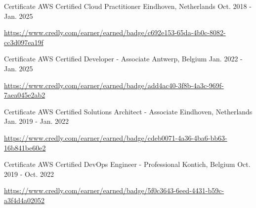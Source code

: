 

\begin{cventries}

  \cventry
    {Certificate} %
    {AWS Certified Cloud Practitioner} %
    {Eindhoven, Netherlands} %
    {Oct. 2018 - Jan. 2025} %
    {
      \begin{cvitems} %
        \item \url{https://www.credly.com/earner/earned/badge/c692e153-65da-4b0c-8082-cc3d097ea19f}
      \end{cvitems}
    }

  \cventry
    {Certificate} %
    {AWS Certified Developer - Associate} %
    {Antwerp, Belgium} %
    {Jan. 2022 - Jan. 2025} %
    {
      \begin{cvitems} %
        \item \url{https://www.credly.com/earner/earned/badge/add4ac40-3f8b-4a3c-969f-7aea045e2ab2}
      \end{cvitems}
    }

  \cventry
    {Certificate} %
    {AWS Certified Solutions Architect - Associate} %
    {Eindhoven, Netherlands} %
    {Jan. 2019 - Jan. 2022} %
    {
      \begin{cvitems} %
        \item \url{https://www.credly.com/earner/earned/badge/cdeb0071-4a36-4ba6-bb63-16b841be60e2}
      \end{cvitems}
    }

  \cventry
    {Certificate} %
    {AWS Certified DevOps Engineer - Professional} %
    {Kontich, Belgium} %
    {Oct. 2019 - Oct. 2022} %
    {
      \begin{cvitems} %
        \item \url{https://www.credly.com/earner/earned/badge/5f0c3643-6eed-4431-b59c-a3f4d4a02052}
      \end{cvitems}
    }


\end{cventries}
